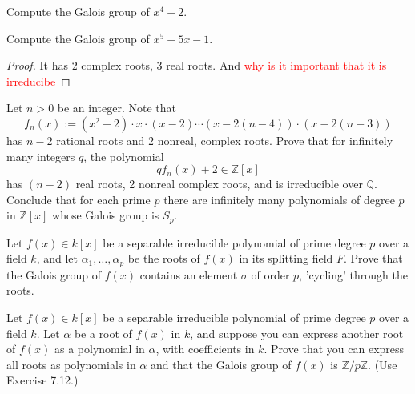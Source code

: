 \documentclass[openany]{book}
\begin{document}

\begin{prob}
Compute the Galois group of \( x^4 - 2 \).
\end{prob}



\begin{prob}
    Compute the Galois group of  \( x^5 - 5x - 1 \). 
\end{prob}
\begin{proof}
    It has $2$ complex roots, $3$ real roots. And 
    \textcolor{red}{why is it important that it is irreducibe}
\end{proof}

\begin{prob}
Let \( n > 0 \) be an integer. Note that
\[ f_n(x) := (x^2 + 2) \cdot x \cdot (x - 2) \cdots (x - 2(n - 4)) \cdot (x - 2(n - 3)) \]
has \( n - 2 \) rational roots and 2 nonreal, complex roots. Prove that for infinitely many integers \( q \), the polynomial
\[ qf_n(x) + 2 \in \mathbb{Z}[x] \]
has \( (n - 2) \) real roots, 2 nonreal complex roots, and is irreducible over \( \mathbb{Q} \). Conclude that for each prime \( p \) there are infinitely many polynomials of degree \( p \) in \( \mathbb{Z}[x] \) whose Galois group is \( S_p \).
\end{prob}

\begin{prob}
Let \( f(x) \in k[x] \) be a separable irreducible polynomial of prime degree \( p \) over a field \( k \), and let \( \alpha_1, \ldots, \alpha_p \) be the roots of \( f(x) \) in its splitting field \( F \). Prove that the Galois group of \( f(x) \) contains an element \( \sigma \) of order \( p \), 'cycling' through the roots.
\end{prob}

\begin{prob}
Let \( f(x) \in k[x] \) be a separable irreducible polynomial of prime degree \( p \) over a field \( k \). Let \( \alpha \) be a root of \( f(x) \) in \( \bar{k} \), and suppose you can express another root of \( f(x) \) as a polynomial in \( \alpha \), with coefficients in \( k \). Prove that you can express all roots as polynomials in \( \alpha \) and that the Galois group of \( f(x) \) is \( \mathbb{Z}/p\mathbb{Z} \). (Use Exercise 7.12.)
\end{prob}
\end{document}
